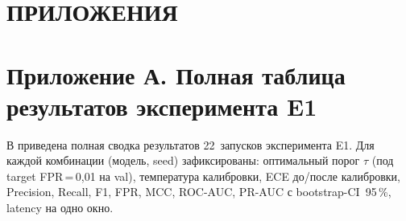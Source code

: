 \appendix
\section*{ПРИЛОЖЕНИЯ}

\renewcommand{\thetable}{А.\arabic{table}}
\renewcommand{\thefigure}{А.\arabic{figure}}
\setcounter{table}{0}
\setcounter{figure}{0}

\section*{Приложение А. Полная таблица результатов эксперимента E1}
\label{app:E1-raw}

В  приведена полная сводка результатов 22~запусков
эксперимента E1. Для каждой комбинации (модель, seed) зафиксированы:
оптимальный порог $\tau$ (под target FPR\,=\,0{,}01 на val),
температура калибровки, ECE до/после калибровки, Precision, Recall,
F1, FPR, MCC, ROC-AUC, PR-AUC с bootstrap-CI~95\,\%, latency на одно
окно.

